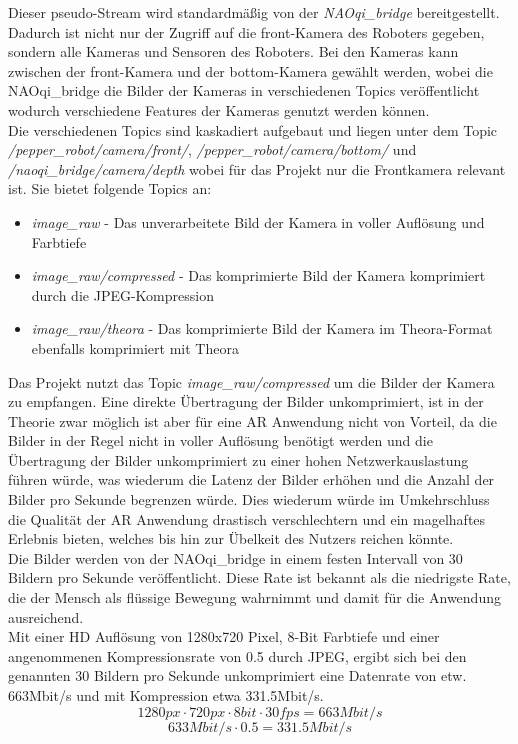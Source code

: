 \noindent
Dieser pseudo-Stream wird standardmäßig von der \textit{NAOqi\_bridge} bereitgestellt. Dadurch ist nicht nur der Zugriff auf die front-Kamera des Roboters gegeben, sondern alle Kameras und Sensoren des Roboters. Bei den Kameras kann zwischen der front-Kamera und der bottom-Kamera gewählt werden, wobei die NAOqi\_bridge die Bilder der Kameras in verschiedenen Topics veröffentlicht wodurch verschiedene Features der Kameras genutzt werden können.
\\

\noindent
Die verschiedenen Topics sind kaskadiert aufgebaut und liegen unter dem Topic \textit{/pepper\_robot/camera/front/}, \textit{/pepper\_robot/camera/bottom/} und \textit{/naoqi\_bridge/camera/depth}  wobei für das Projekt nur die Frontkamera relevant ist. Sie bietet folgende Topics an:
\begin{itemize}
    \item \textit{image\_raw} - Das unverarbeitete Bild der Kamera in voller Auflösung und Farbtiefe
    \item \textit{image\_raw/compressed} - Das komprimierte Bild der Kamera komprimiert durch die \ac{JPEG}-Kompression
    \item \textit{image\_raw/theora} - Das komprimierte Bild der Kamera im Theora-Format ebenfalls komprimiert mit Theora
\end{itemize}
Das Projekt nutzt das Topic \textit{image\_raw/compressed} um die Bilder der Kamera zu empfangen. Eine direkte Übertragung der Bilder unkomprimiert, ist in der Theorie zwar möglich ist aber für eine \ac{AR} Anwendung nicht von Vorteil, da die Bilder in der Regel nicht in voller Auflösung benötigt werden und die Übertragung der Bilder unkomprimiert zu einer hohen Netzwerkauslastung führen würde, was wiederum die Latenz der Bilder erhöhen und die Anzahl der Bilder pro Sekunde begrenzen würde. Dies wiederum würde im Umkehrschluss die Qualität der \ac{AR} Anwendung drastisch verschlechtern und ein magelhaftes Erlebnis bieten, welches bis hin zur Übelkeit des Nutzers reichen könnte.
\\

\noindent
Die Bilder werden von der NAOqi\_bridge in einem festen Intervall von 30 Bildern pro Sekunde veröffentlicht. Diese Rate ist bekannt als die niedrigste Rate, die der Mensch als flüssige Bewegung wahrnimmt und damit für die Anwendung ausreichend.
\\

\noindent
Mit einer \ac{HD} Auflösung von 1280x720 Pixel, 8-Bit Farbtiefe und einer angenommenen Kompressionsrate von 0.5 durch \ac{JPEG}, ergibt sich bei den genannten 30 Bildern pro Sekunde unkomprimiert eine Datenrate von etw. 663Mbit/s und mit Kompression etwa 331.5Mbit/s.\\
\begin{equation}
    1280px \cdot 720px \cdot 8bit \cdot 30fps = 663Mbit/s
    \label{eq:datenrate}
\end{equation}
\begin{equation}
    633Mbit/s \cdot 0.5 = 331.5Mbit/s
    \label{eq:datenrate-komprimiert}
\end{equation}

